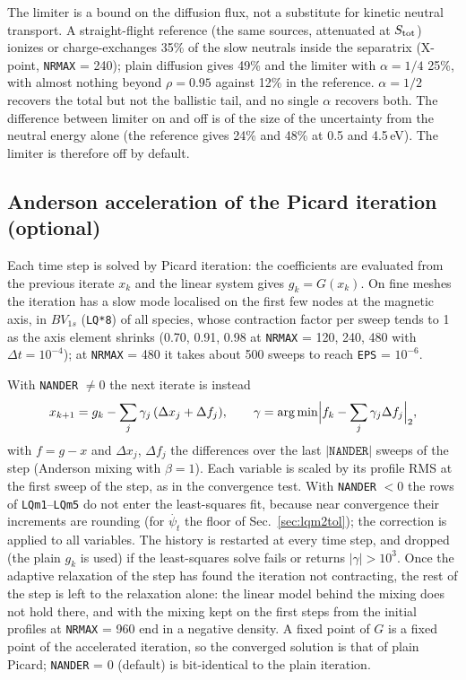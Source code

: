\documentclass[11pt]{article}
\def\r#1{{\rm#1}}
\def\psit{\psi_t}
\def\psitd{\dot{\psit}}
\begin{document}
The limiter is a bound on the diffusion flux, not a substitute for kinetic
neutral transport.  A straight-flight reference (the same sources, attenuated at
$S_\r{tot}$) ionizes or charge-exchanges 35\% of the slow neutrals inside the
separatrix (X-point, \texttt{NRMAX} = 240); plain diffusion gives 49\% and the limiter
with $\alpha = 1/4$ 25\%, with almost nothing beyond $\rho = 0.95$ against 12\% in the
reference.  $\alpha = 1/2$ recovers the total but not the ballistic tail, and no
single $\alpha$ recovers both.  The difference between limiter on and off is of the
size of the uncertainty from the neutral energy alone (the reference gives 24\%
and 48\% at 0.5 and 4.5\,eV).  The limiter is therefore off by default.

\subsection{Anderson acceleration of the Picard iteration (optional)}

Each time step is solved by Picard iteration: the coefficients are evaluated
from the previous iterate $x_k$ and the linear system gives $g_k = G(x_k)$.  On
fine meshes the iteration has a slow mode localised on the first few nodes at
the magnetic axis, in $BV_{1s}$ (\texttt{LQ*8}) of all species, whose contraction
factor per sweep tends to 1 as the axis element shrinks (0.70, 0.91, 0.98 at
\texttt{NRMAX} = 120, 240, 480 with $\Delta t = 10^{-4}$); at \texttt{NRMAX} = 480
it takes about 500 sweeps to reach \texttt{EPS} = $10^{-6}$.

With \texttt{NANDER} $\ne 0$ the next iterate is instead
\[
  x_{k+1} = g_k - \sum_j \gamma_j\,(\Delta x_j + \Delta f_j),\qquad
  \gamma = \arg\min\Bigl|f_k - \sum_j \gamma_j \Delta f_j\Bigr|_2,
\]
with $f = g - x$ and $\Delta x_j$, $\Delta f_j$ the differences over the last
$|\texttt{NANDER}|$ sweeps of the step (Anderson mixing with $\beta = 1$).  Each
variable is scaled by its profile RMS at the first sweep of the step, as in the
convergence test.  With \texttt{NANDER} $< 0$ the rows of \texttt{LQm1}--\texttt{LQm5} do not
enter the least-squares fit, because near convergence their increments are
rounding (for $\psitd$ the floor of Sec.~\ref{sec:lqm2tol}); the correction is
applied to all variables.  The history
is restarted at every time step, and dropped (the plain $g_k$ is used) if the
least-squares solve fails or returns $|\gamma| > 10^3$.  Once the adaptive
relaxation of the step has found the iteration not contracting, the rest of the
step is left to the relaxation alone: the linear model behind the mixing does not
hold there, and with the mixing kept on the first steps from the initial profiles
at \texttt{NRMAX} = 960 end in a negative density.  A fixed point of $G$ is
a fixed point of the accelerated iteration, so the converged solution is that of
plain Picard; \texttt{NANDER} = 0 (default) is bit-identical to the plain iteration.
\end{document}
